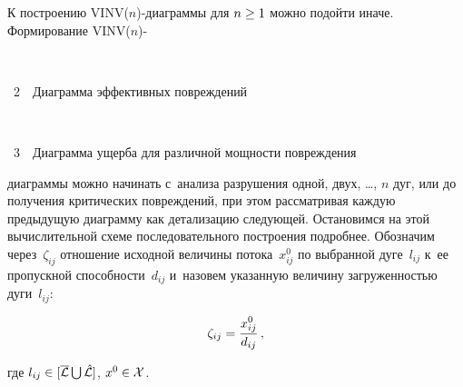 \begin{multicols}{2}
К построению VINV($n$)-диа\-грам\-мы для $n \hm\geq 1$ можно подойти иначе. 
Формирование VINV($n$)-\linebreak\vspace*{-12pt}

{ \begin{center}  %
 \vspace*{9pt}
\mbox{%
 \epsfxsize=65.351mm 
 }


\vspace*{6pt}


\noindent
{{\figurename~2}\ \ \small{Диаграмма эффективных повреждений}}
\end{center}
}




\addtocounter{figure}{1}

\noindent
{ \begin{center}  %
 \vspace*{-1pt}
\mbox{%
 \epsfxsize=71.885mm 
 }


\end{center}


\noindent
{{\figurename~3}\ \ \small{Диаграмма ущерба для различной мощности повреждения}}

}



\vspace*{14pt}

\addtocounter{figure}{1}

\noindent
диа\-грам\-мы можно начинать с~анализа разрушения одной, 
двух, \ldots, $n$ дуг,  или до получения критических повреждений, 
при этом рассматривая каждую предыдущую диаграмму как детализацию сле\-ду\-ющей.
Остановимся на этой вычислительной схеме последовательного построения подробнее.
Обозначим через~$\zeta_{ij}$ отношение исходной величины потока~$x_{ij}^0$ 
по выбранной дуге~$l_{ij}$ к~ее пропускной способности~$d_{ij}$ и~назовем 
указанную величину загруженностью дуги~$l_{ij}$:

\vspace*{2pt}

\noindent
\begin{equation}
\zeta_{ij} = \displaystyle\frac{\displaystyle x_{ij}^0\mathstrut}{\displaystyle d_{ij}\mathstrut}\,,
\label{e8-mal}
\end{equation}

\vspace*{-2pt}

\noindent
где $l_{ij} \in [\overline 
{\cal L} \bigcup \hat {\cal L}]$, $x^0 \hm\in {\cal X}$.




\end{multicols}
